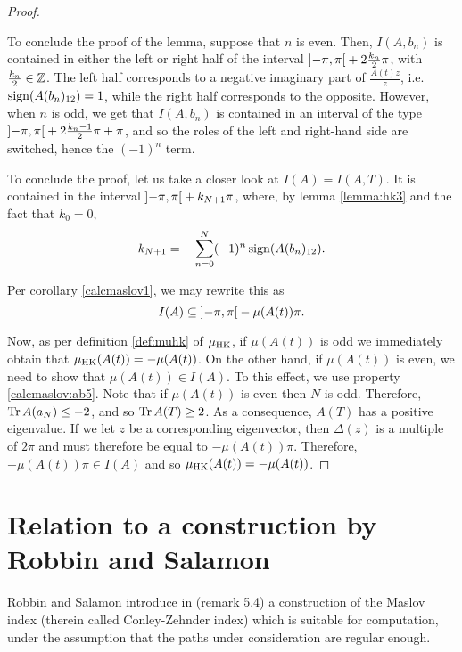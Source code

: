 \begin{proof}
\begin{lemmaproof}
To conclude the proof of the lemma, suppose that $n$ is even. Then, $I(A,b_n)$ is contained in either the left or right half of the interval $\ointerval{-\pi}\pi + 2 \frac{k_n}2 \pi$, with $\frac{k_n}2 \in \mathbb{Z}$. The left half corresponds to a negative imaginary part of $\frac{A(t) z}z$, i.e. $\operatorname{sign}(A(b_n)_{12}) = 1$, while the right half corresponds to the opposite. However, when $n$ is odd, we get that $I(A,b_n)$ is contained in an interval of the type $\ointerval{-\pi}\pi + 2 \frac{k_n - 1}2 \pi + \pi$, and so the roles of the left and right-hand side are switched, hence the $(-1)^n$ term.
\end{lemmaproof}

To conclude the proof, let us take a closer look at $I(A) = I(A,T)$. It is contained in the interval $\ointerval{-\pi}\pi + k_{N+1} \pi$, where, by lemma \ref{lemma:hk3} and the fact that $k_0 = 0$,
\begin{equation}
k_{N+1} = - \sum_{n = 0}^N (-1)^n \operatorname{sign}(A(b_n)_{12}).
\end{equation}

Per corollary \ref{calcmaslov1}, we may rewrite this as
\begin{equation}
I(A) \subseteq \ointerval{-\pi}\pi - \mu(A(t)) \pi.
\end{equation}

Now, as per definition \ref{def:muhk} of $\mu_{\mathrm{HK}}$, if $\mu(A(t))$ is odd we immediately obtain that $\mu_{\mathrm{HK}}(A(t)) = -\mu(A(t))$. On the other hand, if $\mu(A(t))$ is even, we need to show that $\mu(A(t)) \in I(A)$. To this effect, we use property \ref{calcmaslov:ab5}. Note that if $\mu(A(t))$ is even then $N$ is odd. Therefore, $\operatorname{Tr} A(a_N) \leq -2$, and so $\operatorname{Tr} A(T) \geq 2$. As a consequence, $A(T)$ has a positive eigenvalue. If we let $z$ be a corresponding eigenvector, then $\Delta(z)$ is a multiple of $2\pi$ and must therefore be equal to $-\mu(A(t)) \pi$. Therefore, $-\mu(A(t)) \pi \in I(A)$ and so $\mu_{\mathrm{HK}}(A(t)) = -\mu(A(t))$.
\end{proof}

\section{Relation to a construction by Robbin and Salamon}\label{sec:robbin}

Robbin and Salamon introduce in \cite{robbin1993maslov} (remark 5.4) a construction of the Maslov index (therein called Conley-Zehnder index) which is suitable for computation, under the assumption that the paths under consideration are regular enough.

